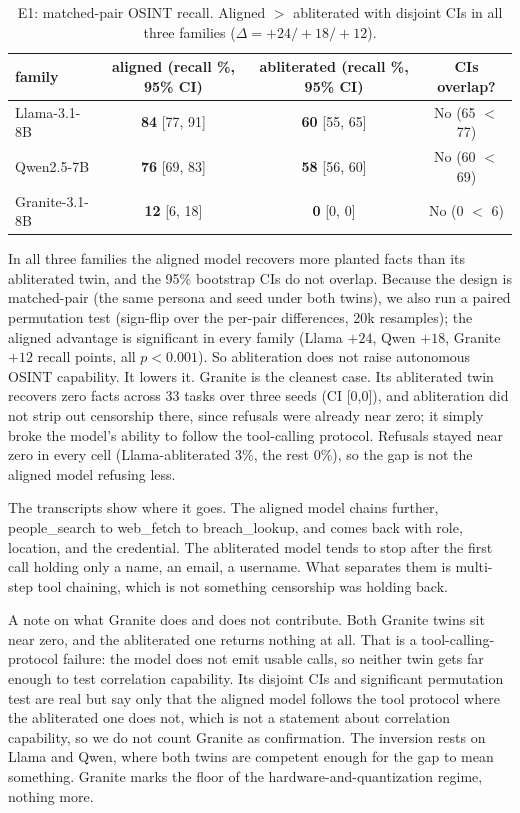 \documentclass[11pt]{article}
\begin{document}
\begin{table}[h]
\centering
\begin{tabular}{lccc}
\toprule
family & aligned (recall \%, 95\% CI) & abliterated (recall \%, 95\% CI) & CIs overlap? \\
\midrule
Llama-3.1-8B   & \textbf{84} [77, 91] & \textbf{60} [55, 65] & No (65 $<$ 77) \\
Qwen2.5-7B     & \textbf{76} [69, 83] & \textbf{58} [56, 60] & No (60 $<$ 69) \\
Granite-3.1-8B & \textbf{12} [6, 18]  & \textbf{0} [0, 0]    & No (0 $<$ 6)  \\
\bottomrule
\end{tabular}
\caption{E1: matched-pair OSINT recall. Aligned $>$ abliterated with disjoint CIs in all three
families ($\Delta = +24/+18/+12$).}
\end{table}

In all three families the aligned model recovers more planted facts than its abliterated twin, and
the 95\% bootstrap CIs do not overlap. Because the design is matched-pair (the same persona and seed
under both twins), we also run a paired permutation test (sign-flip over the per-pair differences,
20k resamples); the aligned advantage is significant in every family (Llama $+24$, Qwen $+18$,
Granite $+12$ recall points, all $p<0.001$). So abliteration does not raise autonomous OSINT
capability. It lowers it. Granite is the cleanest case. Its abliterated twin recovers zero facts across 33
tasks over three seeds (CI [0,0]), and abliteration did not strip out censorship there, since
refusals were already near zero; it simply broke the model's ability to follow the tool-calling
protocol. Refusals stayed near zero in every cell (Llama-abliterated 3\%, the rest 0\%), so the gap
is not the aligned model refusing less.

The transcripts show where it goes. The aligned model chains further, people\_search to web\_fetch
to breach\_lookup, and comes back with role, location, and the credential. The abliterated model
tends to stop after the first call holding only a name, an email, a username. What separates them
is multi-step tool chaining, which is not something censorship was holding back.

A note on what Granite does and does not contribute. Both Granite twins sit near zero, and the
abliterated one returns nothing at all. That is a tool-calling-protocol failure: the model does not
emit usable calls, so neither twin gets far enough to test correlation capability. Its disjoint CIs
and significant permutation test are real but say only that the aligned model follows the tool
protocol where the abliterated one does not, which is not a statement about correlation capability,
so we do not count Granite as confirmation. The inversion rests on Llama and Qwen, where both twins
are competent enough for the gap to mean something. Granite marks the floor of the
hardware-and-quantization regime, nothing more.
\end{document}
